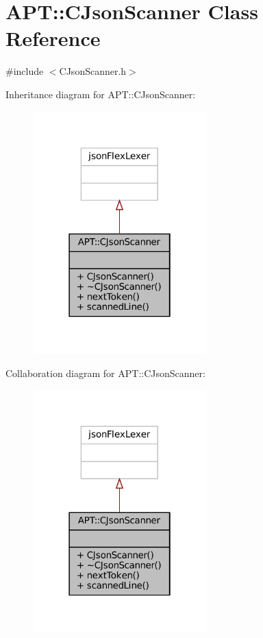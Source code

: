 \hypertarget{classAPT_1_1CJsonScanner}{}\section{A\+PT\+:\+:C\+Json\+Scanner Class Reference}
\label{classAPT_1_1CJsonScanner}


{\ttfamily \#include $<$C\+Json\+Scanner.\+h$>$}



Inheritance diagram for A\+PT\+:\+:C\+Json\+Scanner\+:
\nopagebreak
\begin{figure}[H]
\begin{center}
\leavevmode
\includegraphics[width=190pt]{classAPT_1_1CJsonScanner__inherit__graph}
\end{center}
\end{figure}


Collaboration diagram for A\+PT\+:\+:C\+Json\+Scanner\+:
\nopagebreak
\begin{figure}[H]
\begin{center}
\leavevmode
\includegraphics[width=190pt]{classAPT_1_1CJsonScanner__coll__graph}
\end{center}
\end{figure}
